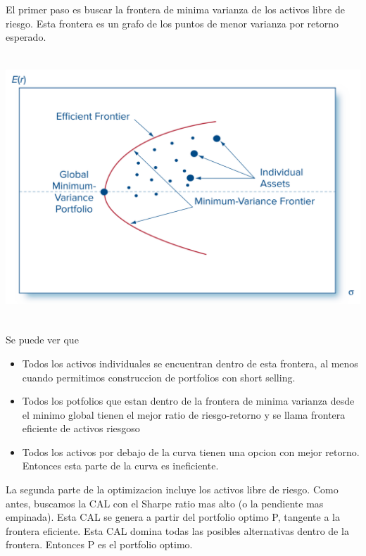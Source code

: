 \documentclass{article}
\begin{document}
El primer paso es buscar la frontera de minima varianza de los activos libre de riesgo. Esta frontera es 
 un grafo de los puntos de menor varianza por retorno esperado.
 
\includegraphics[width=15cm, height=10cm]{./img/7_minima_varianza.png}

Se puede ver que

\begin{itemize}
  \item Todos los activos individuales se encuentran dentro de esta frontera, al menos cuando permitimos construccion
de portfolios con short selling.
  \item Todos los potfolios que estan dentro de la frontera de minima varianza desde el minimo global tienen el mejor ratio de riesgo-retorno y se llama frontera eficiente de activos riesgoso
  \item Todos los activos por debajo de la curva tienen una opcion con mejor retorno. Entonces esta parte de la curva es ineficiente.
\end{itemize}

\newpage
La segunda parte de la optimizacion incluye los activos libre de riesgo. Como antes, buscamos la CAL con el Sharpe ratio mas alto (o la pendiente mas empinada).
Esta CAL se genera a partir del portfolio optimo P, tangente a la frontera eficiente. Esta CAL domina todas las posibles alternativas dentro de la frontera. Entonces P 
es el portfolio optimo.
\end{document}

